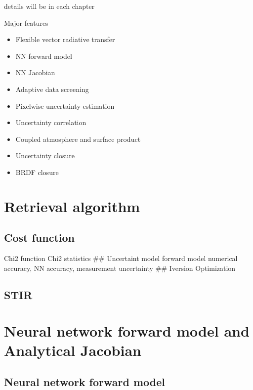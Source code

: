 \documentclass[
  letterpaper,
]{scrbook}
\providecommand{\tightlist}{%
  \setlength{\itemsep}{0pt}\setlength{\parskip}{0pt}}
\begin{document}
details will be in each chapter

Major features

\begin{itemize}
\tightlist
\item
  Flexible vector radiative transfer
\item
  NN forward model
\item
  NN Jacobian
\item
  Adaptive data screening
\item
  Pixelwise uncertainty estimation
\item
  Uncertainty correlation
\item
  Coupled atmosphere and surface product
\item
  Uncertainty closure
\item
  BRDF closure
\end{itemize}


\chapter{Retrieval algorithm}\label{retrieval-algorithm}

\section{Cost function}\label{cost-function}

Chi2 function Chi2 statistics \#\# Uncertaint model forward model
numerical accuracy, NN accuracy, measurement uncertainty \#\# Iversion
Optimization

\section{STIR}\label{stir}


\chapter{Neural network forward model and Analytical
Jacobian}\label{neural-network-forward-model-and-analytical-jacobian}

\section{Neural network forward
model}\label{neural-network-forward-model}
\end{document}
